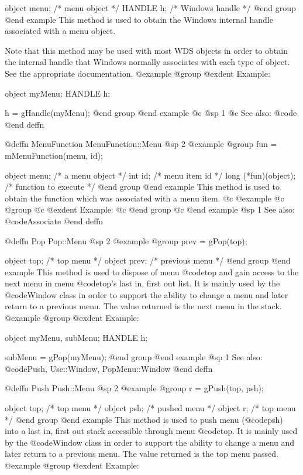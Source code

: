 object  menu;   /*  menu object    */
HANDLE  h;      /*  Windows handle */
@end group
@end example
This method is used to obtain the Windows internal handle associated with
a menu object.  

Note that this method may be used with most WDS objects in order to obtain
the internal handle that Windows normally associates with each type of object.
See the appropriate documentation.
@example
@group
@exdent Example:

object  myMenu;
HANDLE  h;

h = gHandle(myMenu);
@end group
@end example
@c @sp 1
@c See also:  @code{}
@end deffn









@deffn {MenuFunction} MenuFunction::Menu
@sp 2
@example
@group
fun = mMenuFunction(menu, id);

object  menu;   /*  a menu object     */
int     id;     /*  menu item id      */
long    (*fun)(object);  /*  function to execute  */
@end group
@end example
This method is used to obtain the function which was associated with a
menu item.
@c @example
@c @group
@c @exdent Example:
@c @end group
@c @end example
@sp 1
See also:  @code{Associate}
@end deffn







@deffn {Pop} Pop::Menu
@sp 2
@example
@group
prev = gPop(top);

object  top;    /*  top menu       */
object  prev;   /*  previous menu  */
@end group
@end example
This method is used to dispose of menu @code{top} and gain access to the
next menu in menu @code{top}'s last in, first out list.  It is mainly
used by the @code{Window} class in order to support the ability to
change a menu and later return to a previous menu.  The value returned
is the next menu in the stack.
@example
@group
@exdent Example:

object  myMenu, subMenu;
HANDLE  h;

subMenu = gPop(myMenu);
@end group
@end example
@sp 1
See also:  @code{Push, Use::Window, PopMenu::Window}
@end deffn






@deffn {Push} Push::Menu
@sp 2
@example
@group
r = gPush(top, psh);

object  top;    /*  top menu     */
object  psh;    /*  pushed menu  */
object  r;      /*  top menu     */
@end group
@end example
This method is used to push menu (@code{psh}) into a last in, first out
stack accessible through menu @code{top}.  It is mainly used by the
@code{Window} class in order to support the ability to change a menu and
later return to a previous menu.  The value returned is the top menu
passed.
@example
@group
@exdent Example:

